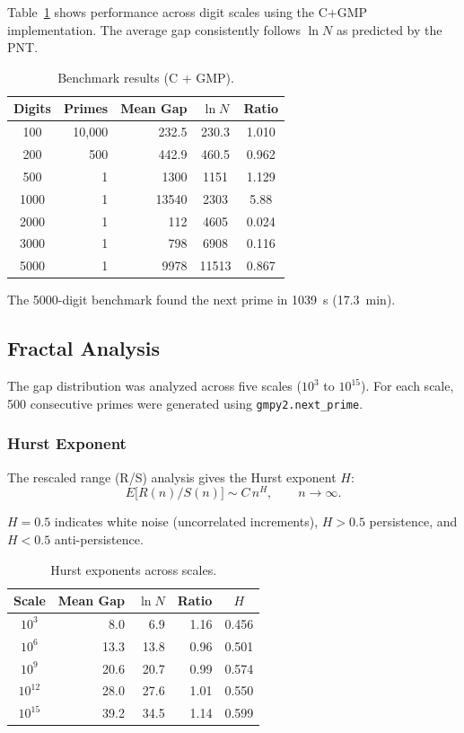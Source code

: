 \documentclass[12pt,a4paper]{article}
\theoremstyle{plain}
\begin{document}
Table~\ref{tab:bench} shows performance across digit scales using the
C+GMP implementation.  The average gap consistently follows
$\ln N$ as predicted by the PNT.

\begin{table}[htbp]
\centering
\caption{Benchmark results (C + GMP).}
\label{tab:bench}
\begin{tabular}{crrcc}
\hline
Digits & Primes & Mean Gap & $\ln N$ & Ratio \\
\hline
100 & 10,000 & 232.5 & 230.3 & 1.010 \\
200 & 500 & 442.9 & 460.5 & 0.962 \\
500 & 1 & 1300 & 1151 & 1.129 \\
1000 & 1 & 13540 & 2303 & 5.88 \\
2000 & 1 & 112 & 4605 & 0.024 \\
3000 & 1 & 798 & 6908 & 0.116 \\
5000 & 1 & 9978 & 11513 & 0.867 \\
\hline
\end{tabular}
\end{table}

The 5000-digit benchmark found the next prime in 1039~s (17.3~min).

\subsection{Fractal Analysis}
\label{sec:fractal}

The gap distribution was analyzed across five scales ($10^3$ to
$10^{15}$).  For each scale, 500 consecutive primes were generated
using {\tt gmpy2.next\_prime}.

\subsubsection{Hurst Exponent}

The rescaled range (R/S) analysis gives the Hurst exponent $H$:
\[
E\bigl[R(n)/S(n)\bigr] \sim C\,n^H,\qquad n\to\infty.
\]

$H=0.5$ indicates white noise (uncorrelated increments), $H>0.5$
persistence, and $H<0.5$ anti-persistence.

\begin{table}[htbp]
\centering
\caption{Hurst exponents across scales.}
\label{tab:hurst}
\begin{tabular}{crrrc}
\hline
Scale & Mean Gap & $\ln N$ & Ratio & $H$ \\
\hline
$10^3$ & 8.0 & 6.9 & 1.16 & 0.456 \\
$10^6$ & 13.3 & 13.8 & 0.96 & 0.501 \\
$10^9$ & 20.6 & 20.7 & 0.99 & 0.574 \\
$10^{12}$ & 28.0 & 27.6 & 1.01 & 0.550 \\
$10^{15}$ & 39.2 & 34.5 & 1.14 & 0.599 \\
\hline
\end{tabular}
\end{table}
\end{document}
